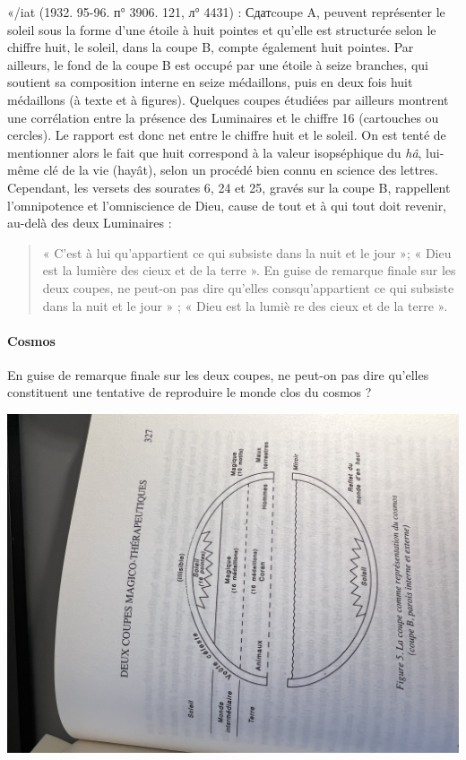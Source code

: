 «/iat (1932. 95-96. п° 3906. 121, л° 4431) : Сдатcoupe A, peuvent représenter le soleil sous la forme d'une étoile à huit pointes et qu'elle est structurée selon le chiffre huit, le soleil, dans la coupe B, compte également huit pointes. Par ailleurs, le fond de la coupe B est occupé par une étoile à seize branches, qui soutient sa composition interne en seize médaillons, puis en deux fois huit médaillons (à texte et à figures). Quelques coupes étudiées par ailleurs montrent une corrélation entre la présence des Luminaires et le chiffre 16 (cartouches ou cercles).
Le rapport est donc net entre le chiffre huit et le soleil. On est tenté de mentionner alors le fait que huit correspond à la valeur isopséphique du \textit{hâ}, lui-même clé de la vie (hayât), selon un procédé bien connu en science des lettres. Cependant, les versets des sourates 6, 24 et 25, gravés sur la coupe B, rappellent l'omnipotence et l'omniscience de Dieu, cause de tout et à qui tout doit revenir, au-delà des deux Luminaires : 
\begin{quote}
   « C'est à lui qu'appartient ce qui subsiste dans la nuit et le jour »; « Dieu est la lumière des cieux et de la terre ».
En guise de remarque finale sur les deux coupes, ne peut-on pas dire qu'elles consqu'appartient ce qui subsiste dans la nuit et le jour » ; « Dieu est la lumiè re des cieux et de la terre ». 
\end{quote}

\paragraph{Cosmos}
En guise de remarque finale sur les deux coupes, ne peut-on pas dire qu'elles constituent une tentative de reproduire le monde clos du cosmos ?

\includegraphics[width=\textwidth]{HommeetIslam/Images/IMG_2459.JPG}



